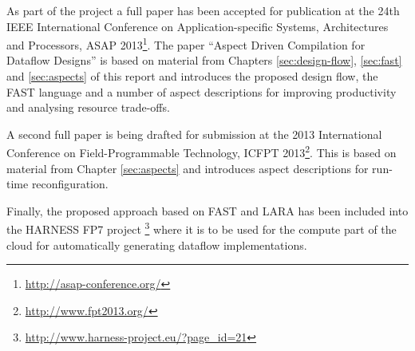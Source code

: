 As part of the project a full paper has been accepted for publication
at the 24th IEEE International Conference on Application-specific
Systems, Architectures and Processors, ASAP
2013\footnote{\url{http://asap-conference.org/}}.  The paper ``Aspect
Driven Compilation for Dataflow Designs'' \cite{pgrig} is based on
material from Chapters \ref{sec:design-flow}, \ref{sec:fast} and
\ref{sec:aspects} of this report and introduces the proposed design
flow, the FAST language and a number of aspect descriptions for
improving productivity and analysing resource trade-offs.

A second full paper is being drafted for submission at the 2013
International Conference on Field-Programmable Technology, ICFPT
2013\footnote{\url{http://www.fpt2013.org/}}. This is based on material
from Chapter \ref{sec:aspects} and introduces aspect descriptions for
run-time reconfiguration.

Finally, the proposed approach based on FAST and LARA has been
included into the HARNESS FP7
project \footnote{\url{http://www.harness-project.eu/?page_id=21}} where it is to be
used for the compute part of the cloud for automatically generating
dataflow implementations.
